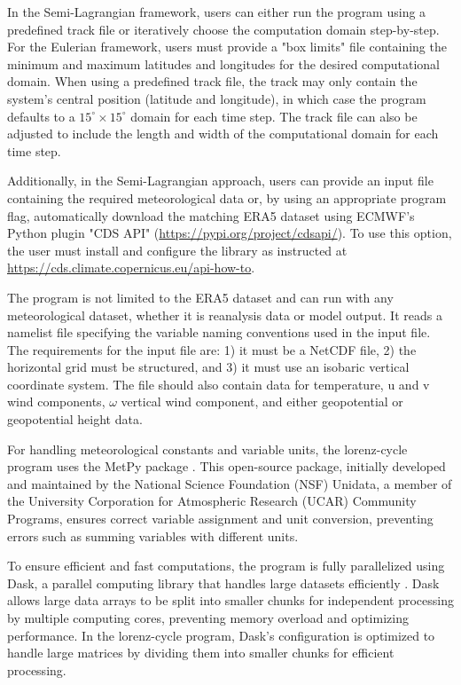 In the Semi-Lagrangian framework, users can either run the program using a predefined track file or iteratively choose the computation domain step-by-step. For the Eulerian framework, users must provide a "box limits" file containing the minimum and maximum latitudes and longitudes for the desired computational domain. When using a predefined track file, the track may only contain the system's central position (latitude and longitude), in which case the program defaults to a $15^\circ \times 15^\circ$ domain for each time step. The track file can also be adjusted to include the length and width of the computational domain for each time step.

Additionally, in the Semi-Lagrangian approach, users can provide an input file containing the required meteorological data or, by using an appropriate program flag, automatically download the matching ERA5 dataset using ECMWF's Python plugin "CDS API" (\url{https://pypi.org/project/cdsapi/}). To use this option, the user must install and configure the library as instructed at \url{https://cds.climate.copernicus.eu/api-how-to}.

The program is not limited to the ERA5 dataset and can run with any meteorological dataset, whether it is reanalysis data or model output. It reads a namelist file specifying the variable naming conventions used in the input file. The requirements for the input file are: 1) it must be a NetCDF file, 2) the horizontal grid must be structured, and 3) it must use an isobaric vertical coordinate system. The file should also contain data for temperature, u and v wind components, $\omega$ vertical wind component, and either geopotential or geopotential height data.

For handling meteorological constants and variable units, the lorenz-cycle program uses the MetPy package \citep{may2022metpy}. This open-source package, initially developed and maintained by the National Science Foundation (NSF) Unidata, a member of the University Corporation for Atmospheric Research (UCAR) Community Programs, ensures correct variable assignment and unit conversion, preventing errors such as summing variables with different units.

To ensure efficient and fast computations, the program is fully parallelized using Dask, a parallel computing library that handles large datasets efficiently \citep{daniel2019data}. Dask allows large data arrays to be split into smaller chunks for independent processing by multiple computing cores, preventing memory overload and optimizing performance. In the lorenz-cycle program, Dask's configuration is optimized to handle large matrices by dividing them into smaller chunks for efficient processing.

